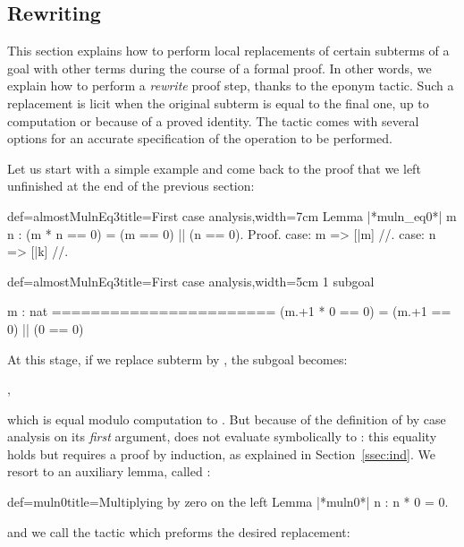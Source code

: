 
\subsection{Rewriting}\label{ssec:rw}

This section explains how to perform local replacements of certain
subterms of a goal with other terms during the course of a formal
proof. In other words, we explain how to perform a
\emph{rewrite} proof step, thanks to the eponym  tactic.
Such a replacement is licit when the original subterm is equal
to the final one, up to computation or because of a proved
identity. The  tactic comes with several options for
an accurate specification of the operation to be performed.

Let us start with a simple example and come back to the proof that we
left unfinished at the end of the previous section:

\begin{coq}{def=almostMulnEq3}{title=First case analysis,width=7cm}
Lemma |*muln_eq0*| m n :
  (m * n == 0) = (m == 0) || (n == 0).
Proof.
case: m => [|m] //.
case: n => [|k] //.
\end{coq}
\begin{coqout}{def=almostMulnEq3}{title=First case analysis,width=5cm}
1 subgoal

m : nat
=======================
(m.+1 * 0 == 0) =
(m.+1 == 0) || (0 == 0)
\end{coqout}
At this stage, if we replace subterm  by , the
subgoal becomes:

\centerline{ ,}
which is equal modulo computation to . But because of
the definition of  by case analysis on its \emph{first}
argument,  does not evaluate symbolically to : this
equality holds but requires a proof by induction, as explained in
Section~\ref{ssec:ind}.
We resort to an auxiliary lemma, called
:

\begin{coq}{def=muln0}{title=Multiplying by zero on the left}
Lemma |*muln0*| n : n * 0 = 0.
\end{coq}
and we call the  tactic which preforms the desired replacement:

